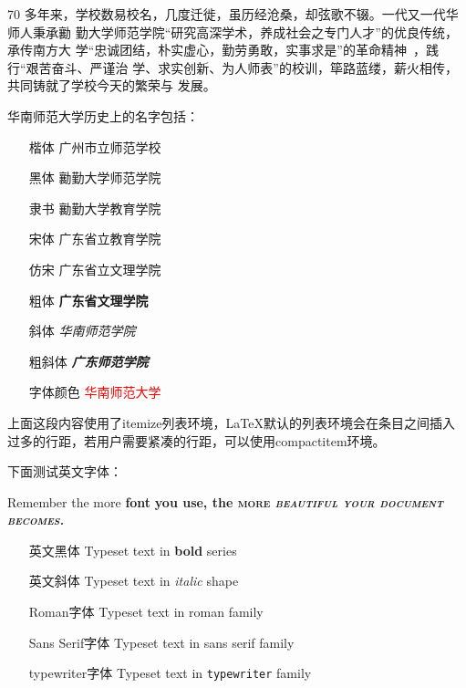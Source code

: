 70 多年来，学校数易校名，几度迁徙，虽历经沧桑，却弦歌不辍。一代又一代华师人秉承勷
勤大学师范学院{\kai “研究高深学术，养成社会之专门人才”}的优良传统，承传南方大
学{\kai “忠诚团结，朴实虚心，勤劳勇敢，实事求是”}的革命精神~，践行{\kai “艰苦奋斗、严谨治
学、求实创新、为人师表”}的校训，筚路蓝缕，薪火相传，共同铸就了学校今天的繁荣与
发展。

华南师范大学历史上的名字包括：

\begin{itemize}
\item[楷体] {\kai 广州市立师范学校}
\item[黑体] {\hei 勷勤大学师范学院}
\item[隶书] {\li 勷勤大学教育学院}
\item[宋体] {\song 广东省立教育学院}
\item[仿宋] {\fs 广东省立文理学院}
\item[粗体] {\bfseries 广东省文理学院}
\item[斜体] {\itshape 华南师范学院}
\item[粗斜体] {\bfseries\itshape 广东师范学院}
\item[字体颜色] {\textcolor{red}{华南师范大学}}
\end{itemize}

上面这段内容使用了itemize列表环境，\LaTeX{}默认的列表环境会在条目之间插入
过多的行距，若用户需要紧凑的行距，可以使用compactitem环境。

下面测试英文字体：

Remember the \textsf{more} \textbf{font} {\bfseries\tiny you \sffamily use,
\Large the \scshape more \itshape beautiful \slshape your \footnotesize
document becomes.}

\begin{itemize}
\item[英文黑体] Typeset text in \textbf{bold} series
\item[英文斜体] Typeset text in \textit{italic} shape
\item[Roman字体] Typeset text in roman family
\item[Sans Serif字体] Typeset text in \textsf{sans serif} family
\item[typewriter字体] Typeset text in \texttt{typewriter} family
\end{itemize}

